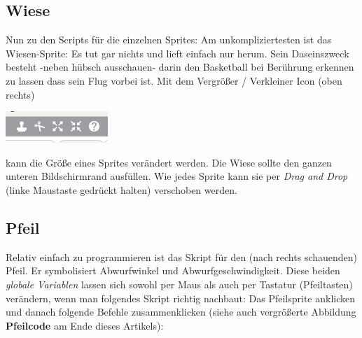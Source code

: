\documentclass[10pt,a4paper,ngerman,twoside]{article} %
\begin{document}
\begin{multicols}{3}
\subsection*{Wiese}

Nun zu den Scripts für die einzelnen Sprites: Am unkompliziertesten ist das Wiesen-Sprite: Es tut gar nichts und lieft einfach nur herum. Sein Daseinszweck besteht -neben hübsch ausschauen- darin den Basketball bei Berührung erkennen zu lassen dass sein Flug vorbei ist. Mit dem Vergrößer / Verkleiner Icon (oben rechts) 

\begin{center}
\includegraphics[width=\linewidth]{scratch/fschrumpfer.png}
\end{center}

kann die Größe eines Sprites verändert werden. Die Wiese sollte den ganzen unteren Bildschirmrand ausfüllen. Wie jedes Sprite kann sie per \textit{Drag and Drop} (linke Maustaste gedrückt halten) verschoben werden.

\subsection*{Pfeil}

Relativ einfach zu programmieren ist das Skript für den (nach rechts schauenden) Pfeil. Er symbolisiert Abwurfwinkel und Abwurfgeschwindigkeit. Diese beiden \textit{globale Variablen} lassen sich sowohl per Maus als auch per Tastatur (Pfeiltasten) verändern, wenn man folgendes Skript richtig nachbaut: Das Pfeilsprite anklicken und danach folgende Befehle zusammenklicken (siehe auch vergrößerte Abbildung \textbf{Pfeilcode} am Ende dieses Artikels):


\end{multicols}
\end{document}
